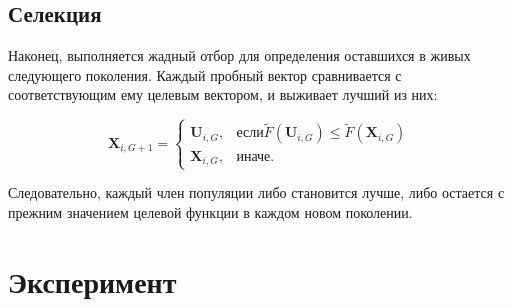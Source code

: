 \subsection{Селекция}

Наконец, выполняется жадный отбор для определения оставшихся в живых следующего поколения. Каждый пробный вектор сравнивается с соответствующим ему целевым вектором, и выживает лучший из них:

\begin{equation}\label{eq:de_sel}
  \textbf{X}_{i,G+1} =
  \begin{cases}
    \textbf{U}_{i,G}, & \mbox{если} \tilde{F}(\textbf{U}_{i,G}) \leq \tilde{F}(\textbf{X}_{i,G}) \\
    \textbf{X}_{i,G}, & \mbox{иначе}.
  \end{cases}
\end{equation}

Следовательно, каждый член популяции либо становится лучше, либо остается с прежним значением целевой функции в каждом новом поколении.

\section{Эксперимент}

